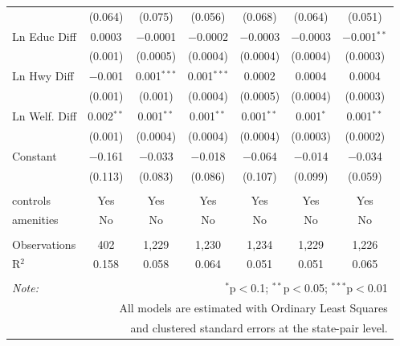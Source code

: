 \begin{table}[!htbp]
\begin{tabular}{@{\extracolsep{5pt}}lcccccc}
  & (0.064) & (0.075) & (0.056) & (0.068) & (0.064) & (0.051) \\ 
  Ln Educ Diff & 0.0003 & $-$0.0001 & $-$0.0002 & $-$0.0003 & $-$0.0003 & $-$0.001$^{**}$ \\ 
  & (0.001) & (0.0005) & (0.0004) & (0.0004) & (0.0004) & (0.0003) \\ 
  Ln Hwy Diff & $-$0.001 & 0.001$^{***}$ & 0.001$^{***}$ & 0.0002 & 0.0004 & 0.0004 \\ 
  & (0.001) & (0.001) & (0.0004) & (0.0005) & (0.0004) & (0.0003) \\ 
  Ln Welf. Diff & 0.002$^{**}$ & 0.001$^{**}$ & 0.001$^{**}$ & 0.001$^{**}$ & 0.001$^{*}$ & 0.001$^{**}$ \\ 
  & (0.001) & (0.0004) & (0.0004) & (0.0004) & (0.0003) & (0.0002) \\ 
  Constant & $-$0.161 & $-$0.033 & $-$0.018 & $-$0.064 & $-$0.014 & $-$0.034 \\ 
  & (0.113) & (0.083) & (0.086) & (0.107) & (0.099) & (0.059) \\ 
 \hline \\[-1.8ex] 
controls & Yes & Yes & Yes & Yes & Yes & Yes \\ 
amenities & No & No & No & No & No & No \\ 
\hline \\[-1.8ex] 
Observations & 402 & 1,229 & 1,230 & 1,234 & 1,229 & 1,226 \\ 
R$^{2}$ & 0.158 & 0.058 & 0.064 & 0.051 & 0.051 & 0.065 \\ 
\hline 
\hline \\[-1.8ex] 
\textit{Note:}  & \multicolumn{6}{r}{$^{*}$p$<$0.1; $^{**}$p$<$0.05; $^{***}$p$<$0.01} \\ 
 & \multicolumn{6}{r}{All models are estimated with Ordinary Least Squares} \\ 
 & \multicolumn{6}{r}{and clustered standard errors at the state-pair level.} \\ 
\end{tabular} 
\end{table} 
